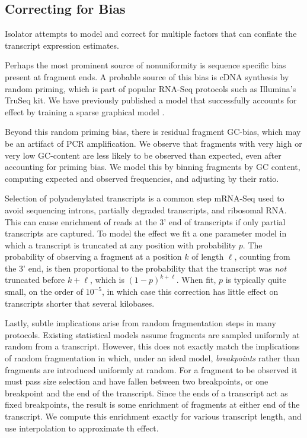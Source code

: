 \documentclass[twocolumn]{article}
\begin{document}
\subsection{Correcting for Bias}\label{correcting-for-bias}

Isolator attempts to model and correct for multiple factors that can
conflate the transcript expression estimates.

Perhaps the most prominent source of nonuniformity is sequence specific
bias present at fragment ends. A probable source of this bias is cDNA
synthesis by random priming, which is part of popular RNA-Seq protocols
such as Illumina's TruSeq kit. We have previously published a model that
successfully accounts for effect by training a sparse graphical model
\cite{Jones:2012hg}.

Beyond this random priming bias, there is residual fragment GC-bias,
which may be an artifact of PCR amplification. We observe that fragments
with very high or very low GC-content are less likely to be observed
than expected, even after accounting for priming bias. We model this by
binning fragments by GC content, computing expected and observed
frequencies, and adjusting by their ratio.

Selection of polyadenylated transcripts is a common step mRNA-Seq used
to avoid sequencing introns, partially degraded transcripts, and
ribosomal RNA. This can cause enrichment of reads at the 3' end of
transcripts if only partial transcripts are captured. To model the
effect we fit a one parameter model in which a transcript is truncated
at any position with probability $p$. The probability of observing a
fragment at a position $k$ of length $\ell$, counting from the 3' end,
is then proportional to the probability that the transcript was
\emph{not} truncated before $k + \ell$, which is $(1-p)^{k + \ell}$.
When fit, $p$ is typically quite small, on the order of $10^{-5}$, in
which case this correction has little effect on transcripts shorter that
several kilobases.

Lastly, subtle implications arise from random fragmentation steps in many
protocols. Existing statistical models assume fragments are sampled uniformly
at random from a transcript. However, this does not exactly match the
implications of random fragmentation in which, under an ideal model,
\emph{breakpoints} rather than fragments are introduced uniformly at random. For
a fragment to be observed it must pass size selection and have fallen between
two breakpoints, or one breakpoint and the end of the transcript. Since the ends
of a transcript act as fixed breakpoints, the result is some enrichment of
fragments at either end of the transcript. We compute this enrichment exactly
for various transcript length, and use interpolation to approximate th effect.



\end{document}
